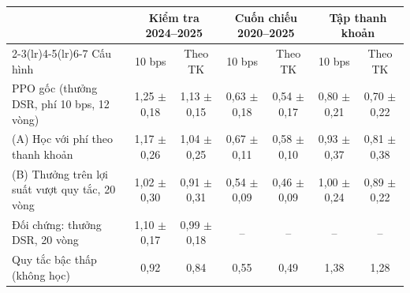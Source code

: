 \begin{tabular}{@{}lcccccc@{}}
\toprule
 & \multicolumn{2}{c}{Kiểm tra 2024--2025} & \multicolumn{2}{c}{Cuốn chiếu 2020--2025} & \multicolumn{2}{c}{Tập thanh khoản} \\
\cmidrule(lr){2-3}\cmidrule(lr){4-5}\cmidrule(lr){6-7}
Cấu hình & 10 bps & Theo TK & 10 bps & Theo TK & 10 bps & Theo TK \\
\midrule
PPO gốc (thưởng DSR, phí 10 bps, 12 vòng) & 1{,}25 $\pm$ 0{,}18 & 1{,}13 $\pm$ 0{,}15 & 0{,}63 $\pm$ 0{,}18 & 0{,}54 $\pm$ 0{,}17 & 0{,}80 $\pm$ 0{,}21 & 0{,}70 $\pm$ 0{,}22 \\
(A) Học với phí theo thanh khoản & 1{,}17 $\pm$ 0{,}26 & 1{,}04 $\pm$ 0{,}25 & 0{,}67 $\pm$ 0{,}11 & 0{,}58 $\pm$ 0{,}10 & 0{,}93 $\pm$ 0{,}37 & 0{,}81 $\pm$ 0{,}38 \\
(B) Thưởng trên lợi suất vượt quy tắc, 20 vòng & 1{,}02 $\pm$ 0{,}30 & 0{,}91 $\pm$ 0{,}31 & 0{,}54 $\pm$ 0{,}09 & 0{,}46 $\pm$ 0{,}09 & 1{,}00 $\pm$ 0{,}24 & 0{,}89 $\pm$ 0{,}22 \\
Đối chứng: thưởng DSR, 20 vòng & 1{,}10 $\pm$ 0{,}17 & 0{,}99 $\pm$ 0{,}18 & -- & -- & -- & -- \\
Quy tắc bậc thấp (không học) & 0{,}92 & 0{,}84 & 0{,}55 & 0{,}49 & 1{,}38 & 1{,}28 \\
\bottomrule
\end{tabular}
